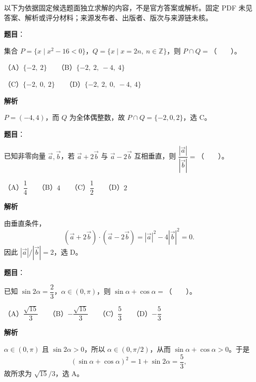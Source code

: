 

\begin{gktip}
以下为依据固定候选题面独立求解的内容，不是官方答案或解析。固定 PDF 未见答案、解析或评分材料；来源发布者、出版者、版次与来源链未核。
\end{gktip}

\begin{answer}

\textbf{题目}：

集合 $P=\{x\mid x^2-16<0\}$，$Q=\{x\mid x=2n,\ n\in\mathbb Z\}$，则 $P\cap Q=$\mbox{（　　）}。

（A）$\{-2,\ 2\}$　　（B）$\{-2,\ 2,\ -4,\ 4\}$

（C）$\{-2,\ 0,\ 2\}$　　（D）$\{-2,\ 2,\ 0,\ -4,\ 4\}$

\textbf{解析}

$P=(-4,4)$，而 $Q$ 为全体偶整数，故 $P\cap Q=\{-2,0,2\}$，选 C。


\end{answer}
\begin{answer}

\textbf{题目}：

已知非零向量 $\vec a,\vec b$，若 $\vec a+2\vec b$ 与 $\vec a-2\vec b$ 互相垂直，则 $\dfrac{|\vec a|}{|\vec b|}=$\mbox{（　　）}。

（A）$\dfrac14$　　（B）$4$　　（C）$\dfrac12$　　（D）$2$

\textbf{解析}

由垂直条件，
\nopagebreak[4]
\[
(\vec a+2\vec b)\cdot(\vec a-2\vec b)=|\vec a|^2-4|\vec b|^2=0.
\]
因此 $|\vec a|/|\vec b|=2$，选 D。


\end{answer}
\begin{answer}

\textbf{题目}：

已知 $\sin 2\alpha=\dfrac23$，$\alpha\in(0,\pi)$，则 $\sin\alpha+\cos\alpha=$\mbox{（　　）}。

（A）$\dfrac{\sqrt{15}}3$　　（B）$-\dfrac{\sqrt{15}}3$　　（C）$\dfrac53$　　（D）$-\dfrac53$

\textbf{解析}

$\alpha\in(0,\pi)$ 且 $\sin2\alpha>0$，所以 $\alpha\in(0,\pi/2)$，从而 $\sin\alpha+\cos\alpha>0$。于是
\nopagebreak[4]
\[
(\sin\alpha+\cos\alpha)^2=1+\sin2\alpha=\frac53,
\]
故所求为 $\sqrt{15}/3$，选 A。


\end{answer}
